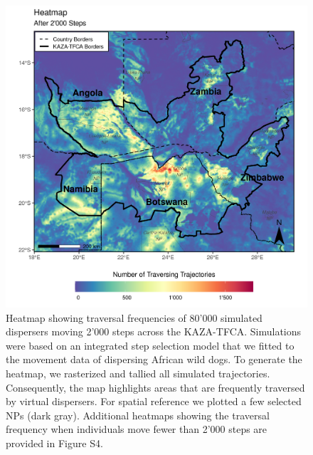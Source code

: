 \documentclass[abstract=on,10pt,a4paper,bibliography=totocnumbered]{article}
\begin{document}
\begin{figure}
  \includegraphics[width=\textwidth]{99_Heatmap.png}
  \caption{Heatmap showing traversal frequencies of 80'000 simulated dispersers
  moving 2'000 steps across the KAZA-TFCA. Simulations were based on an
  integrated step selection model that we fitted to the movement data of
  dispersing African wild dogs. To generate the heatmap, we rasterized and
  tallied all simulated trajectories. Consequently, the map highlights areas
  that are frequently traversed by virtual dispersers. For spatial reference we
  plotted a few selected NPs (dark gray). Additional heatmaps showing the
  traversal frequency when individuals move fewer than 2'000 steps are provided
  in Figure S4.}
  \label{Heatmap}
\end{figure}
\end{document}
